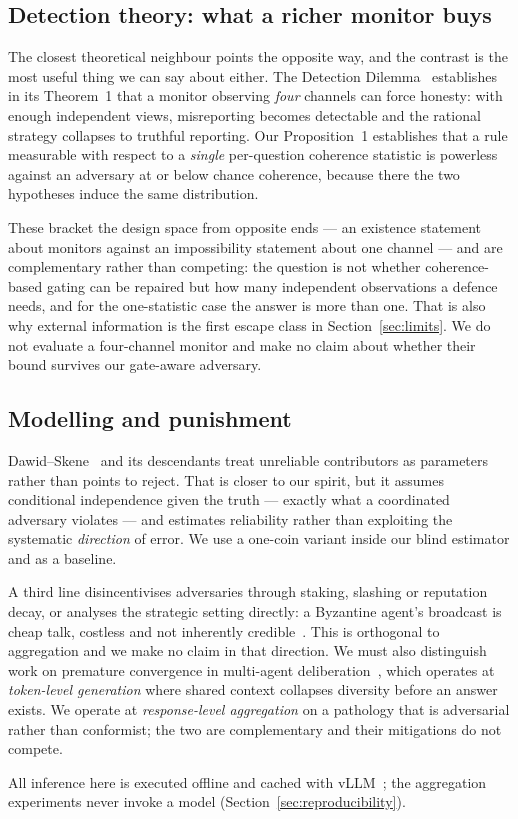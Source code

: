 \subsection{Detection theory: what a richer monitor buys}

The closest theoretical neighbour points the opposite way, and the contrast is
the most useful thing we can say about either. The Detection
Dilemma~\cite{detectiondilemma} establishes in its Theorem~1 that a monitor
observing \emph{four} channels can force honesty: with enough independent views,
misreporting becomes detectable and the rational strategy collapses to truthful
reporting. Our Proposition~1 establishes that a rule measurable with respect to a
\emph{single} per-question coherence statistic is powerless against an adversary
at or below chance coherence, because there the two hypotheses induce the same
distribution.

These bracket the design space from opposite ends --- an existence statement
about monitors against an impossibility statement about one channel --- and are
complementary rather than competing: the question is not whether coherence-based
gating can be repaired but how many independent observations a defence needs, and
for the one-statistic case the answer is more than one. That is also why external
information is the first escape class in Section~\ref{sec:limits}. We do not
evaluate a four-channel monitor and make no claim about whether their bound
survives our gate-aware adversary.

\subsection{Modelling and punishment}

Dawid--Skene~\cite{dawidskene1979} and its descendants treat unreliable
contributors as parameters rather than points to reject. That is closer to our
spirit, but it assumes conditional independence given the truth --- exactly what
a coordinated adversary violates --- and estimates reliability rather than
exploiting the systematic \emph{direction} of error. We use a one-coin variant
inside our blind estimator and as a baseline.

A third line disincentivises adversaries through staking, slashing or reputation
decay, or analyses the strategic setting directly: a Byzantine agent's broadcast
is cheap talk, costless and not inherently credible~\cite{cheaptalk}. This is
orthogonal to aggregation and we make no claim in that direction. We must also
distinguish work on premature convergence in multi-agent
deliberation~\cite{consensustrap}, which operates at \emph{token-level
generation} where shared context collapses diversity before an answer exists. We
operate at \emph{response-level aggregation} on a pathology that is adversarial
rather than conformist; the two are complementary and their mitigations do not
compete.

All inference here is executed offline and cached with vLLM~\cite{vllm}; the
aggregation experiments never invoke a model (Section~\ref{sec:reproducibility}).
